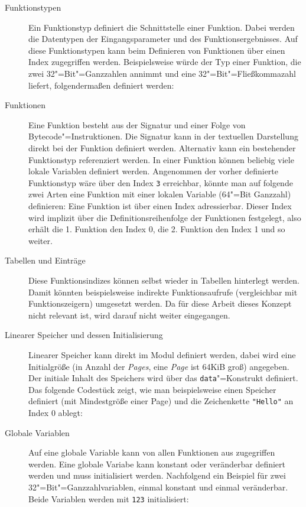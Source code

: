\begin{description}
    \item[Funktionstypen] Ein Funktionstyp definiert die Schnittstelle einer Funktion. Dabei werden die Datentypen der Eingangsparameter und des Funktionsergebnisses. Auf diese Funktionstypen kann beim Definieren von Funktionen über einen Index zugegriffen werden. Beispielsweise würde der Typ einer Funktion, die zwei 32"=Bit"=Ganzzahlen annimmt und eine 32"=Bit"=Fließkommazahl liefert, folgendermaßen definiert werden: 
    \item[Funktionen] Eine Funktion besteht aus der Signatur und einer Folge von Bytecode"=Instruktionen. Die Signatur kann in der textuellen Darstellung direkt bei der Funktion definiert werden. Alternativ kann ein bestehender Funktionstyp referenziert werden. In einer Funktion können beliebig viele lokale Variablen definiert werden. Angenommen der vorher definierte Funktionstyp wäre über den Index \lstinline{3} erreichbar, könnte man auf folgende zwei Arten eine Funktion mit einer lokalen Variable (64"=Bit Ganzzahl) definieren: 
    Eine Funktion ist über einen Index adressierbar. Dieser Index wird implizit über die Definitionsreihenfolge der Funktionen festgelegt, also erhält die 1. Funktion den Index 0, die 2. Funktion den Index 1 und so weiter.
    \item[Tabellen und Einträge] Diese Funktionsindizes können selbst wieder in Tabellen hinterlegt werden. Damit könnten beispielsweise indirekte Funktionsaufrufe (vergleichbar mit Funktionszeigern) umgesetzt werden. Da für diese Arbeit dieses Konzept nicht relevant ist, wird darauf nicht weiter  eingegangen.
    \item[Linearer Speicher und dessen Initialisierung] Linearer Speicher kann direkt im Modul definiert werden, dabei wird eine Initialgröße (in Anzahl der \emph{Pages}, eine \emph{Page} ist 64KiB groß) angegeben. Der initiale Inhalt des Speichers wird über das \lstinline{data}"=Konstrukt definiert. Das folgende Codestück zeigt, wie man beispielsweise einen Speicher definiert (mit Mindestgröße einer Page) und die Zeichenkette \lstinline{"Hello"} an Index 0 ablegt: 
    \item[Globale Variablen] Auf eine globale Variable kann von allen Funktionen aus zugegriffen werden. Eine globale Variabe kann konstant oder veränderbar definiert werden und muss initialisiert werden. Nachfolgend ein Beispiel für zwei 32"=Bit"=Ganzzahlvariablen, einmal konstant und einmal veränderbar. Beide Variablen werden mit \lstinline{123} initialisiert: 

\end{description}
